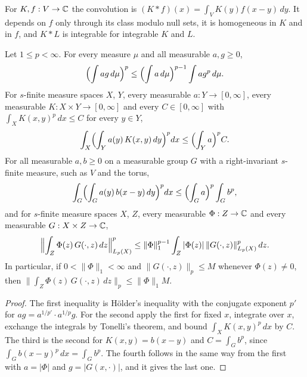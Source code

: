 \begin{definition}[Convolution]
\label{def:conv}
\leanok
For $K, f : V \to \mathbb{C}$ the convolution is $(K * f)(x) = \int_V K(y) f(x - y) \, dy$. It depends
on $f$ only through its class modulo null sets, it is homogeneous in $K$ and in $f$, and $K * L$
is integrable for integrable $K$ and $L$.
\end{definition}

\begin{lemma}
\label{lem:weighted-jensen}
\leanok
Let $1 \leq p < \infty$. For every measure $\mu$ and all measurable $a, g \geq 0$,
\[
  \Bigl( \int a g \, d\mu \Bigr)^p \leq \Bigl( \int a \, d\mu \Bigr)^{p-1} \int a g^p \, d\mu .
\]
For $s$-finite measure spaces $X$, $Y$, every measurable $a : Y \to [0, \infty]$, every
measurable $K : X \times Y \to [0, \infty]$ and every $C \in [0, \infty]$ with
$\int_X K(x, y)^p \, dx \leq C$ for every $y \in Y$,
\[
  \int_X \Bigl( \int_Y a(y) \, K(x, y) \, dy \Bigr)^p dx \leq \Bigl( \int_Y a \Bigr)^p C .
\]
For all measurable $a, b \geq 0$ on a measurable group $G$ with a right-invariant $s$-finite
measure, such as $V$ and the torus,
\[
  \int_G \Bigl( \int_G a(y) \, b(x - y) \, dy \Bigr)^p dx
  \leq \Bigl( \int_G a \Bigr)^p \int_G b^p ,
\]
and for $s$-finite measure spaces $X$, $Z$, every measurable $\Phi : Z \to \mathbb{C}$ and every measurable
$G : X \times Z \to \mathbb{C}$,
\[
  \Bigl\| \int_Z \Phi(z) \, G(\cdot, z) \, dz \Bigr\|_{L_p(X)}^p
  \leq \|\Phi\|_1^{p-1} \int_Z |\Phi(z)| \, \|G(\cdot, z)\|_{L_p(X)}^p \, dz .
\]
In particular, if $0 < \|\Phi\|_1 < \infty$ and $\|G(\cdot, z)\|_p \leq M$ whenever
$\Phi(z) \neq 0$, then $\| \int_Z \Phi(z) \, G(\cdot, z) \, dz \|_p \leq \|\Phi\|_1 M$.
\end{lemma}

\begin{proof}
\leanok
The first inequality is Hölder's inequality with the conjugate exponent $p'$ for
$a g = a^{1/p'} \cdot a^{1/p} g$. For the second apply the first for fixed $x$, integrate over
$x$, exchange the integrals by Tonelli's theorem, and bound $\int_X K(x, y)^p \, dx$ by $C$. The
third is the second for $K(x, y) = b(x - y)$ and $C = \int_G b^p$, since
$\int_G b(x - y)^p \, dx = \int_G b^p$. The fourth follows in the same way from the first with
$a = |\Phi|$ and $g = |G(x, \cdot)|$, and it gives the last one.
\end{proof}

